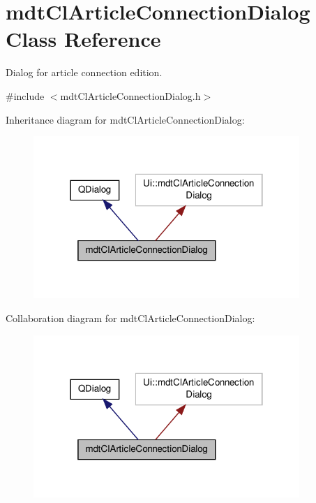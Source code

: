 \hypertarget{classmdt_cl_article_connection_dialog}{\section{mdt\-Cl\-Article\-Connection\-Dialog Class Reference}
\label{classmdt_cl_article_connection_dialog}
}


Dialog for article connection edition.  




{\ttfamily \#include $<$mdt\-Cl\-Article\-Connection\-Dialog.\-h$>$}



Inheritance diagram for mdt\-Cl\-Article\-Connection\-Dialog\-:
\nopagebreak
\begin{figure}[H]
\begin{center}
\leavevmode
\includegraphics[width=286pt]{classmdt_cl_article_connection_dialog__inherit__graph}
\end{center}
\end{figure}


Collaboration diagram for mdt\-Cl\-Article\-Connection\-Dialog\-:
\nopagebreak
\begin{figure}[H]
\begin{center}
\leavevmode
\includegraphics[width=286pt]{classmdt_cl_article_connection_dialog__coll__graph}
\end{center}
\end{figure}
